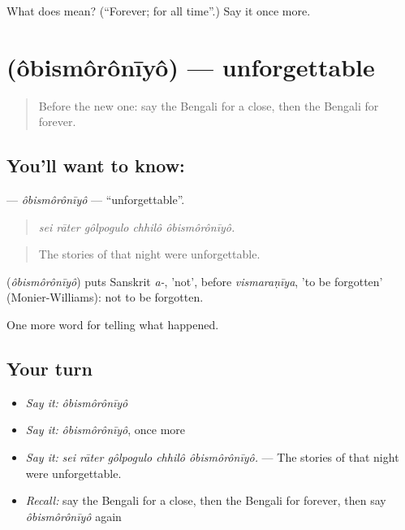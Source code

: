 \begin{tcolorbox}[breakable,colback=teal!4,colframe=teal!35!black,title={Before you move on}]
What does  mean? (\textquotedblleft{}Forever; for all time\textquotedblright{}.) Say it once more.
\end{tcolorbox}
\section[\texorpdfstring{\bn{অবিস্মরণীয়} (ôbismôrônīyô)}{অবিস্মরণীয় (ôbismôrônīyô)}]{ (ôbismôrônīyô) — unforgettable}

\label{lesson:BN-C329-obismoroniyo}



\begin{quote}
Before the new one: say the Bengali for a close, then the Bengali for forever.
\end{quote}

\subsection*{You'll want to know: }
\textbf{} — \emph{ôbismôrônīyô} — \textquotedblleft{}unforgettable\textquotedblright{}.

\begin{quote}
    
\end{quote}

\begin{quote}
\emph{sei rāter gôlpogulo chhilô ôbismôrônīyô.}
\end{quote}

\begin{quote}
The stories of that night were unforgettable.
\end{quote}

\begin{cousinweb}
\textbf{} (\emph{ôbismôrônīyô}) puts Sanskrit \emph{a-}, 'not', before \emph{vismaraṇīya}, 'to be forgotten' (Monier-Williams): not to be forgotten.
\end{cousinweb}

\begin{grammarlens}[title={What you've built}]
One more word for telling what happened.
\end{grammarlens}

\subsection*{Your turn}
\begin{itemize}
\raggedright
  \item \emph{Say it:} \emph{ôbismôrônīyô}
  \item \emph{Say it:} \emph{ôbismôrônīyô}, once more
  \item \emph{Say it:} \emph{sei rāter gôlpogulo chhilô ôbismôrônīyô.} — The stories of that night were unforgettable.
  \item \emph{Recall:} say the Bengali for a close, then the Bengali for forever, then say \emph{ôbismôrônīyô} again
\end{itemize}

